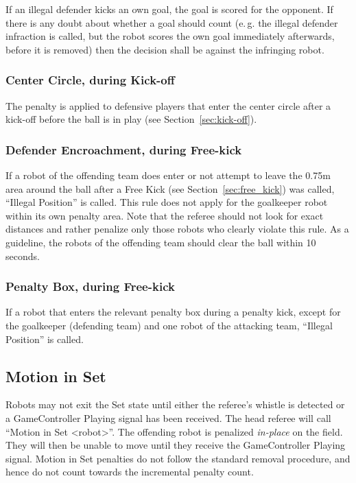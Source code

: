 \documentclass[12pt]{article}
\newcommand{\eg}{\mbox{e.\,g.}\xspace}
\newcommand{\cf}{see\xspace}
\newcommand{\FreeKickRadius}{0.75m\xspace}
\begin{document}
If an illegal defender kicks an own goal, the goal is scored for the opponent. If there is any doubt about whether a goal should count (\eg the illegal defender infraction is called, but the robot scores the own goal immediately afterwards, before it is removed) then the decision shall be against the infringing robot.

\subsubsection{Center Circle, during Kick-off}

The penalty is applied to defensive players that enter the center circle after a kick-off before the ball is in play (\cf Section~\ref{sec:kick-off}).

\subsubsection{Defender Encroachment, during Free-kick}

If a robot of the offending team does enter or not attempt to leave the \FreeKickRadius area around the ball after a Free Kick (\cf Section~\ref{sec:free_kick}) was called, ``Illegal Position'' is called. This rule does not apply for the goalkeeper robot within its own penalty area. Note that the referee should not look for exact distances and rather penalize only those robots who clearly violate this rule. As a guideline, the robots of the offending team should clear the ball within 10 seconds.

\subsubsection{Penalty Box, during Free-kick}

If a robot that enters the relevant penalty box during a penalty kick, except for the goalkeeper (defending team) and one robot of the attacking team, ``Illegal Position'' is called.

\subsection{Motion in Set}
\label{sec:motion_in_set}

Robots may not exit the Set state until either the referee's whistle is detected or a GameController Playing signal has been received.
The head referee will call ``Motion in Set \textless robot\textgreater''.
The offending robot is penalized \textit{in-place} on the field.  They will then be unable to move until they receive the GameController Playing signal.  Motion in Set penalties do not follow the standard removal procedure, and hence do not count towards the incremental penalty count.
\end{document}
